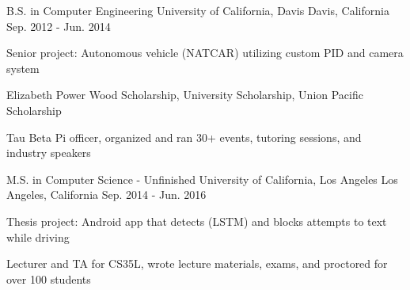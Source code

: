 

\begin{cventries}

  \cventry
    {B.S. in Computer Engineering} %
    {University of California, Davis} %
    {Davis, California} %
    {Sep. 2012 - Jun. 2014} %
    {} %
    {
      \begin{cvitems} %
        \item {Senior project: Autonomous vehicle (NATCAR) utilizing custom PID and camera system}
        \item {Elizabeth Power Wood Scholarship, University Scholarship, Union Pacific Scholarship}
        \item {Tau Beta Pi officer, organized and ran 30+ events, tutoring sessions, and industry speakers}
      \end{cvitems}
    }

  \cventry
    {M.S. in Computer Science - Unfinished} %
    {University of California, Los Angeles} %
    {Los Angeles, California} %
    {Sep. 2014 - Jun. 2016} %
    {} %
    {
        \begin{cvitems} %
        \item {Thesis project: Android app that detects (LSTM) and blocks attempts to text while driving}
        \item {Lecturer and TA for CS35L, wrote lecture materials, exams, and proctored for over 100 students}
        \end{cvitems}
    }

\end{cventries}
